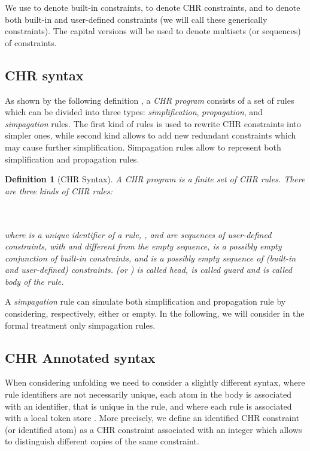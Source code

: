 \documentclass{tlp}
\newtheorem{definition}{Definition} \newtheorem{proposition}{Proposition} \newtheorem{example}{Example} \newtheorem{corollary}{Corollary} \newtheorem{theorem}{Theorem} \newtheorem{lemma}{Lemma}
\begin{document}
We use  to denote built-in constraints,  to denote CHR
constraints, and  to denote both built-in and user-defined
constraints (we will call these generically constraints). The capital
versions will be used to denote multisets
(or sequences) of constraints.



\subsection{CHR syntax}\label{sec:syntax}
As shown by the following definition \cite{Fru98}, a  \emph{CHR program}
consists of a set of rules which can be divided into three types:
\emph{simplification}, \emph{propagation}, and \emph{simpagation}
rules. The first kind of rules is used to rewrite
CHR constraints into simpler ones, while second kind allows to add new redundant
constraints which may cause further simplification. Simpagation rules allow to represent both simplification and propagation rules.

\begin{definition}[{\sc CHR Syntax}]
A CHR program is a finite set of CHR rules.
There are three kinds of CHR rules:

\\
\\
\noindent where  is a unique identifier of a rule, ,
 and  are sequences of user-defined constraints, with   and
 different from the empty sequence,  is a possibly empty conjunction of built-in constraints,
and  is a possibly empty sequence of (built-in and
user-defined) constraints.  (or ) is called
\emph{head},  is called \emph{guard} and  is called \emph{body} of the rule.
\end{definition}

A  \emph{simpagation} rule can simulate both simplification and
propagation rule by considering, respectively, either  or
 empty. In the following, we
will consider in the formal treatment only simpagation rules.

\subsection{CHR Annotated syntax}\label{sec:annsyntax}

When considering unfolding we need to consider a slightly
different syntax,  where rule identifiers are not necessarily
unique, each atom in the body is associated with an identifier,
that is unique in the rule, and
where each rule is associated  with a local token store .
More precisely, we define an identified CHR constraint  (or
identified atom)  as a CHR constraint  associated with
an integer  which allows to distinguish different copies of the
same constraint.
\end{document}
